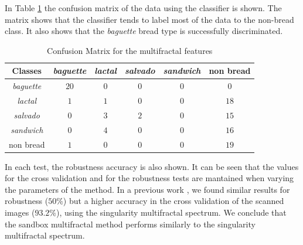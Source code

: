\documentclass[oneside,a4paper,english,links]{article}
\begin{document}

In Table \ref{table:ConfusionMatrixFractal} the confusion matrix of the data using the classifier is shown. The matrix shows that the classifier tends to label most of the data to the non-bread class. It also shows that the {\em baguette} bread type is successfully discriminated.
\begin{table}[htb]
\centering
\begin{tabular}{|c|c|c|c|c|c|}
    \hline
    Classes & {\em baguette} & {\em lactal} & {\em salvado} & {\em sandwich} & non bread\\
    \hline
    \hline
    {\em baguette}  & $20$ & $0$ & $0$ & $0$  & $0$\\
    \hline
    {\em lactal}    & $1$ & $1$ & $0$ & $0$  & $18$\\
    \hline
    {\em salvado}   & $0$ & $3$ & $2$ & $0$  & $15$\\
    \hline
    {\em sandwich}  & $0$ & $4$  & $0$ & $0$ & $16$\\
    \hline
    non bread       & $1$ & $0$  & $0$ & $0$  & $19$\\
    \hline
\end{tabular}
\caption{Confusion Matrix for the multifractal features}
\label{table:ConfusionMatrixFractal}
\end{table}

In each test, the robustness accuracy is also shown. It can be seen that the values for the cross validation and for the robustness tests are mantained when varying the parameters of the method. In a previous work \cite{Baravalle2012b}, we found similar results for robustness ($50\%$) but a higher accuracy in the cross validation of the scanned images ($93.2\%$), using the singularity multifractal spectrum. We conclude that the sandbox multifractal method performs similarly to the singularity multifractal spectrum.
\end{document}
